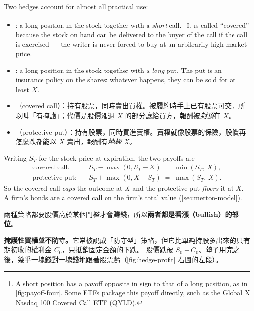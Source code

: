 \noindent Two hedges account for almost all practical use:

\begin{itemize}[itemsep=0.35em]
	\item {}: a long position in the stock together with a \emph{short} call.\footnote{A short position has a payoff opposite in sign to that of a long position, as in \autoref{fig:payoff-four}. Some ETFs package this payoff directly, such as the Global X Nasdaq 100 Covered Call ETF (QYLD).}
	      It is called ``covered'' because the stock on hand can be delivered to the buyer of the call if the call is exercised --- the writer is never forced to buy at an arbitrarily high market price.

	\item {}: a long position in the stock together with a \emph{long} put.
	      The put is an insurance policy on the shares: whatever happens, they can be sold for at least $X$.
\end{itemize}

\suppstart
\begin{remark}
	\begin{itemize}[nosep]
		\item {}（covered call）：持有股票，同時賣出買權。被履約時手上已有股票可交，所以叫「有掩護」；代價是股價漲過 $X$ 的部分讓給買方，報酬被\emph{封頂}在 $X$。
		\item {}（protective put）：持有股票，同時買進賣權。賣權就像股票的保險，股價再怎麼跌都能以 $X$ 賣出，報酬有\emph{地板} $X$。
	\end{itemize}
\end{remark}

Writing $S_{T}$ for the stock price at expiration, the two payoffs are
\begin{equation}
	\begin{aligned}
		\text{covered call:}\quad   & S_{T}-\max(0,S_{T}-X) \;=\; \min(S_{T},\,X) , \\
		\text{protective put:}\quad & S_{T}+\max(0,X-S_{T}) \;=\; \max(S_{T},\,X) .
	\end{aligned}
	\label{eq:hedge-payoffs}
\end{equation}
So the covered call \emph{caps} the outcome at $X$ and the protective put \emph{floors} it at $X$.
A firm's bonds are a covered call on the firm's total value (\autoref{sec:merton-model}).
\suppend

\begin{note}
	\label{note:hedge-bullish}
	兩種策略都要股價高於某個門檻才會賺錢，所以\textbf{兩者都是看漲（bullish）的部位}。
\suppstart

	\textbf{掩護性買權並不防守。}它常被說成「防守型」策略，但它比單純持股多出來的只有期初收的權利金 $C_{0}$，只抵銷固定金額的下跌。
	股價跌破 $S_{0}-C_{0}$、墊子用完之後，幾乎一塊錢對一塊錢地跟著股票虧（\autoref{fig:hedge-profit} 右圖的左段）。
\suppend
\end{note}

